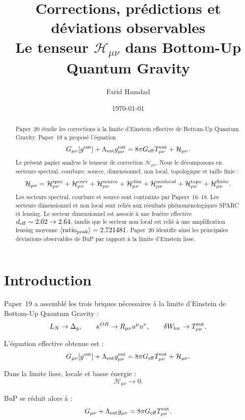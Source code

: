 \documentclass[11pt,a4paper]{article}
\title{
\textbf{Corrections, prédictions et déviations observables}\\
\large Le tenseur \(\mathcal{H}_{\mu\nu}\) dans Bottom-Up Quantum Gravity
}
\author{Farid Hamdad}
\date{\today}
\begin{document}
\maketitle

\begin{abstract}
Paper~20 étudie les corrections à la limite d'Einstein effective de
Bottom-Up Quantum Gravity. Paper~19 a proposé l'équation
\[
G_{\mu\nu}[g^{\rm ent}]
+
\Lambda_{\rm ent}g_{\mu\nu}^{\rm ent}
=
8\pi G_{\rm eff}T_{\mu\nu}^{\rm ent}
+
\mathcal{H}_{\mu\nu}.
\]
Le présent papier analyse le tenseur de correction
\(\mathcal{H}_{\mu\nu}\). Nous le décomposons en secteurs spectral, courbure,
source, dimensionnel, non local, topologique et taille finie :
\[
\mathcal{H}_{\mu\nu}
=
\mathcal{H}^{\rm spec}_{\mu\nu}
+
\mathcal{H}^{\rm curv}_{\mu\nu}
+
\mathcal{H}^{\rm source}_{\mu\nu}
+
\mathcal{H}^{\rm dim}_{\mu\nu}
+
\mathcal{H}^{\rm nonlocal}_{\mu\nu}
+
\mathcal{H}^{\rm topo}_{\mu\nu}
+
\mathcal{H}^{\rm finite}_{\mu\nu}.
\]
Les secteurs spectral, courbure et source sont contraints par Papers~16--18.
Les secteurs dimensionnel et non local sont reliés aux résultats
phénoménologiques SPARC et lensing. Le secteur dimensionnel est associé à une
fenêtre effective \(d_{\rm eff}\sim2.02\to2.64\), tandis que le secteur non
local est relié à une amplification lensing moyenne
\(\langle{\rm ratio}_{\rm peak}\rangle=2.721481\). Paper~20 identifie ainsi
les principales déviations observables de BuP par rapport à la limite
d'Einstein lisse.
\end{abstract}

\tableofcontents

\section{Introduction}

Paper~19 a assemblé les trois briques nécessaires à la limite d'Einstein de
Bottom-Up Quantum Gravity :
\[
L_N\to\Delta_g,
\qquad
\kappa^{OR}\to R_{\mu\nu}u^\mu u^\nu,
\qquad
\delta W_{\rm loc}\to T_{\mu\nu}^{\rm ent}.
\]

L'équation effective obtenue est :
\[
G_{\mu\nu}[g^{\rm ent}]
+
\Lambda_{\rm ent}g_{\mu\nu}^{\rm ent}
=
8\pi G_{\rm eff}T_{\mu\nu}^{\rm ent}
+
\mathcal{H}_{\mu\nu}.
\]

Dans la limite lisse, locale et basse énergie :
\[
\mathcal{H}_{\mu\nu}\to0.
\]

BuP se réduit alors à :
\[
G_{\mu\nu}
+
\Lambda_{\rm ent}g_{\mu\nu}
=
8\pi G_{\rm eff}T_{\mu\nu}^{\rm ent}.
\]
\end{document}
